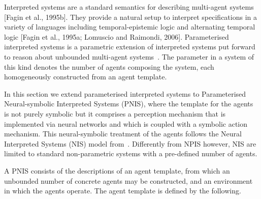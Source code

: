 Interpreted systems are a standard semantics for describing multi-agent systems
[Fagin et al., 1995b]. They provide a natural setup to interpret specifications
in a variety of languages including temporal-epistemic logic and alternating
temporal logic [Fagin et al., 1995a; Lomuscio and Raimondi, 2006].
Parameterised interpreted systems is a parametric extension of interpreted
systems put forward to reason about unbounded multi-agent
systems~\cite{KouvarosLomuscio15b}. The parameter in a system of this kind
denotes the number of agents composing the system, each homogeneously
constructed from an agent template. 

In this section we extend parameterised interpreted systems to Parameterised
Neural-symbolic Interpreted Systems (PNIS), where the template for the agents is
not purely symbolic but it comprises a perception mechanism that is implemented
via neural networks and which is coupled with a symbolic action mechanism. This
neural-symbolic treatment of the agents follows the Neural Interpreted Systems
(NIS) model from~\cite{Akintunde+20b}.  Differently from NPIS however, NIS are
limited to standard non-parametric systems with a pre-defined number of agents.

A PNIS consists of the descriptions of an agent template, from which an
unbounded number of concrete agents may be constructed, and an environment in
which the agents operate. The agent template is defined by the following. 

